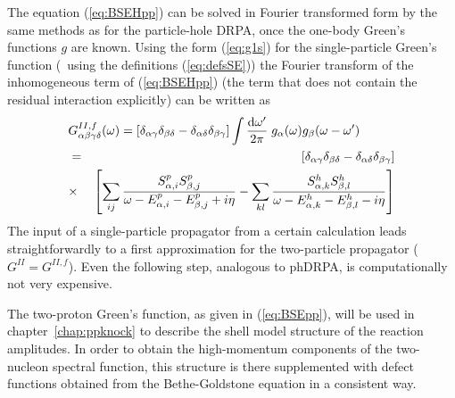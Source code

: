 The equation (\ref{eq:BSEHpp}) can be solved in Fourier transformed 
form by the same methods as
for the particle-hole DRPA, once the one-body Green's functions $g$ are known. 
%
Using the form (\ref{eq:g1s}) for the single-particle Green's function (\ie\
using the definitions (\ref{eq:defsSE}))
the Fourier transform of the inhomogeneous term of (\ref{eq:BSEHpp}) (the term 
that does not contain the residual interaction explicitly) can
be written as 
%
	\begin{eqnarray}
	\lefteqn{%
		G^{II,f}_{\alpha\beta\gamma\delta}(\omega)
	=
		\left[
			\delta_{\alpha\gamma}
			\delta_{\beta\delta}
		-
			\delta_{\alpha\delta}
			\delta_{\beta\gamma}
		\right]
		\int
		\frac{{\rm d} \omega'}
		     { 2 \pi }
		\;
		g_{\alpha}(\omega)
		g_{\beta}(\omega-\omega')
	}
	\label{eq:G2f} \\
	&=&
		\left[
			\delta_{\alpha\gamma}
			\delta_{\beta\delta}
		-
			\delta_{\alpha\delta}
			\delta_{\beta\gamma}
		\right]
	\nonumber \\
	& \times&
		\left[
		\sum_{ij}
		\frac{
		S^p_{\alpha,i} S^p_{\beta,j}
		}{ \omega - E^p_{\alpha,i} - E^p_{\beta,j} + i \eta }
	-
		\sum_{kl}
		\frac{
		S^h_{\alpha,k} S^h_{\beta,l}
		}{ \omega - E^h_{\alpha,k} - E^h_{\beta,l}- i \eta }
		\right]
	\nonumber 
	\end{eqnarray}
%
The input of a single-particle propagator from a certain calculation leads
straightforwardly to a first approximation for the two-particle propagator
($G^{II} = G^{II,f}$). Even the following step, analogous to phDRPA, is 
computationally not very expensive. 

The two-proton Green's function, as given in
(\ref{eq:BSEpp}), will be used in chapter~\ref{chap:ppknock}
to describe the shell model structure of the reaction amplitudes. 
In order to obtain the high-momentum components of the two-nucleon spectral 
function, this structure is there supplemented with defect functions obtained 
from the Bethe-Goldstone equation in a consistent way.
